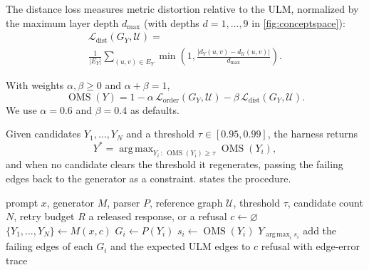 \documentclass[twocolumn]{ulpaper}
\DeclareMathOperator*{\argmax}{arg\,max}
\newcommand{\ULM}{\mathcal{U}}
\newcommand{\OMS}{\operatorname{OMS}}
\newcommand{\Lord}{\mathcal{L}_{\text{order}}}
\newcommand{\Ldist}{\mathcal{L}_{\text{dist}}}
\begin{document}
\begin{definition}
The distance loss measures metric distortion relative to the ULM, normalized by the maximum layer depth $d_{\max}$ (with depths $d = 1, \dots, 9$ in \cref{fig:conceptspace}):
\begin{multline}
\label{eq:ldist}
\Ldist(G_Y, \ULM) = {} \\
\frac{1}{\lvert E_Y \rvert} \sum_{(u,v) \in E_Y} \min\!\left(1, \frac{\lvert d_Y(u,v) - d_\ULM(u,v) \rvert}{d_{\max}}\right).
\end{multline}
\end{definition}

\begin{definition}
With weights $\alpha, \beta \geq 0$ and $\alpha + \beta = 1$,
\begin{equation}
\label{eq:oms}
\OMS(Y) = 1 - \alpha\, \Lord(G_Y, \ULM) - \beta\, \Ldist(G_Y, \ULM).
\end{equation}
\noindent We use $\alpha = 0.6$ and $\beta = 0.4$ as defaults.
\end{definition}

Given candidates $Y_1, \dots, Y_N$ and a threshold $\tau \in [0.95, 0.99]$, the harness returns
\begin{equation}
\label{eq:select}
Y^\ast = \argmax_{Y_i \,:\, \OMS(Y_i) \geq \tau} \OMS(Y_i),
\end{equation}
\noindent and when no candidate clears the threshold it regenerates, passing the failing edges back to the generator as a constraint.  states the procedure.

\begin{algorithm}[t]
\caption{Layer~2 audit gate}
\label{alg:gate}
\begin{algorithmic}[1]
\Require prompt $x$, generator $M$, parser $P$, reference graph $\ULM$, threshold $\tau$, candidate count $N$, retry budget $R$
\Ensure a released response, or a refusal
\State $c \gets \varnothing$ 
  \State $\{Y_1, \dots, Y_N\} \gets M(x, c)$
    \State $G_i \gets P(Y_i)$ 
    \State $s_i \gets \OMS(Y_i)$ 
  \EndFor
    \State \Return $Y_{\argmax_i s_i}$
  \EndIf
  \State add the failing edges of each $G_i$ and the expected ULM edges to $c$
\EndFor
\State \Return refusal with edge-error trace
\end{algorithmic}
\end{algorithm}
\end{document}

